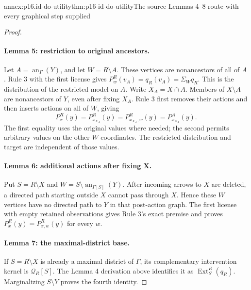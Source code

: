 \begin{annexitem}{annex:p16.id-do-utility}{thm:p16-id-do-utility}{The source Lemmas 4--8 route with every graphical step supplied}
\begin{proof}
\paragraph{Lemma 5: restriction to original ancestors.}
Let \(A=\operatorname{an}_{\Gamma}(Y)\), and let
\(W=R\setminus A\). These vertices are nonancestors of all
of \(A\). Rule 3 with the first license gives
\(P^R_w(v_A)=q_R(v_A)=\Sigma_W q_R\). This is the distribution
of the restricted model on \(A\). Write \(X_A=X\cap A\).
Members of \(X\setminus A\) are nonancestors of \(Y\), even
after fixing \(X_A\). Rule 3 first removes their actions and
then inserts actions on all of \(W\), giving
\[
 P^R_x(y)=P^R_{x_{X_A}}(y)
        =P^R_{x_{X_A},w}(y)=P^A_{x_{X_A}}(y).
\]
The first equality uses the original values where needed; the second
permits arbitrary values on the other \(W\) coordinates. The
restricted distribution and target are independent of those values.

\paragraph{Lemma 6: additional actions after fixing X.}
Put \(S=R\setminus X\) and
\(W=S\setminus\operatorname{an}_{\Gamma[S]}(Y)\).
After incoming arrows to \(X\) are deleted, a directed path
starting outside \(X\) cannot pass through \(X\). Hence
these \(W\) vertices have no directed path to \(Y\) in that
post-action graph. The first license with empty retained observations
gives Rule 3's exact premise and proves
\(P^R_x(y)=P^R_{x,w}(y)\) for every \(w\).

\paragraph{Lemma 7: the maximal-district base.}
If \(S=R\setminus X\) is already a maximal district of
\(\Gamma\), its complementary intervention kernel is
\(\mathcal Q_R[S]\). The Lemma 4 derivation above identifies
it as \(\operatorname{Ext}^R_S(q_R)\). Marginalizing
\(S\setminus Y\) proves the fourth identity.


\end{proof}
\end{annexitem}
